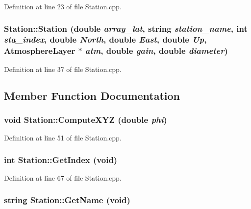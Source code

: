 Definition at line 23 of file Station.cpp.

\hypertarget{classStation_a23e85488389f1f084e5d149564e72e17}{
\subsubsection[{Station}]{\setlength{\rightskip}{0pt plus 5cm}Station::Station (double {\em array\_\-lat}, \/  string {\em station\_\-name}, \/  int {\em sta\_\-index}, \/  double {\em North}, \/  double {\em East}, \/  double {\em Up}, \/  {\bf AtmosphereLayer} $\ast$ {\em atm}, \/  double {\em gain}, \/  double {\em diameter})}}
\label{classStation_a23e85488389f1f084e5d149564e72e17}


Definition at line 37 of file Station.cpp.



\subsection{Member Function Documentation}
\hypertarget{classStation_a9ac5daebf0b5e54276a6afed7b5a61c0}{
\subsubsection[{ComputeXYZ}]{\setlength{\rightskip}{0pt plus 5cm}void Station::ComputeXYZ (double {\em phi})}}
\label{classStation_a9ac5daebf0b5e54276a6afed7b5a61c0}


Definition at line 51 of file Station.cpp.

\hypertarget{classStation_afd50ce755b324127b1f1e8929bff31aa}{
\subsubsection[{GetIndex}]{\setlength{\rightskip}{0pt plus 5cm}int Station::GetIndex (void)}}
\label{classStation_afd50ce755b324127b1f1e8929bff31aa}


Definition at line 67 of file Station.cpp.

\hypertarget{classStation_aad118a81a8498e1196c85b7a16e3be91}{
\subsubsection[{GetName}]{\setlength{\rightskip}{0pt plus 5cm}string Station::GetName (void)}}
\label{classStation_aad118a81a8498e1196c85b7a16e3be91}


